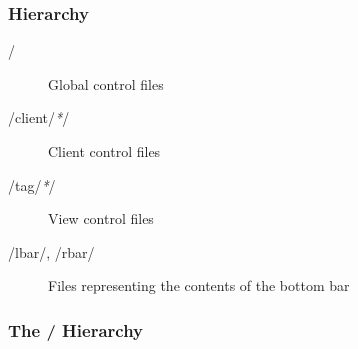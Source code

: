 \subsubsection{Hierarchy}
\begin{description}
\item[/] Global control files
\item[/client/\emph{*}/] Client control files
\item[/tag/\emph{*}/] View control files
\item[/lbar/, /rbar/] Files representing the contents of the
	bottom bar
\end{description}

\subsubsection{The / Hierarchy}
